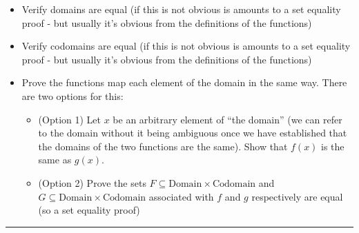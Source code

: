 \documentclass{article}
\begin{document}
	\begin{itemize}
		\item Verify domains are equal (if this is not obvious is amounts to a set equality proof - but usually it's obvious from the definitions of the functions)
		\item Verify codomains are equal (if this is not obvious is amounts to a set equality proof - but usually it's obvious from the definitions of the functions)
		\item Prove the functions map each element of the domain in the same way. There are two options for this:
		\begin{itemize}
			\item (Option 1) Let $x$ be an arbitrary element of ``the domain'' (we can refer to the domain without it being ambiguous once we have established that the domains of the two functions are the same). Show that $f(x)$ is the same as $g(x).$
			\item (Option 2) Prove the sets $F\subseteq\mbox{Domain}\times\mbox{Codomain}$ and $G\subseteq\mbox{Domain}\times\mbox{Codomain}$ associated with $f$ and $g$ respectively are equal (so a set equality proof)
		\end{itemize}
	\end{itemize}

	\vspace{.25cm}
	\hrule
\end{document}
